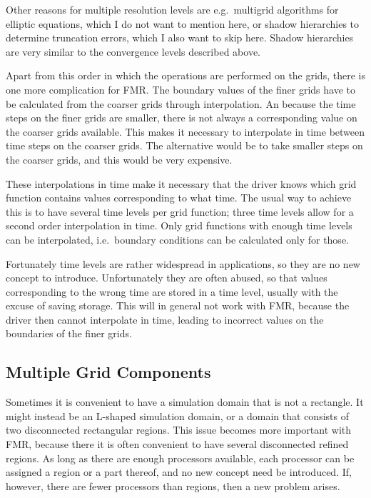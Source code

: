 Other reasons for multiple resolution levels are e.g.\ multigrid
algorithms for elliptic equations, which I do not want to mention
here, or shadow hierarchies to determine truncation errors, which I
also want to skip here.  Shadow hierarchies are very similar to the
convergence levels described above.

Apart from this order in which the operations are performed on the
grids, there is one more complication for FMR.  The boundary values of
the finer grids have to be calculated from the coarser grids through
interpolation.  An because the time steps on the finer grids are
smaller, there is not always a corresponding value on the coarser
grids available.  This makes it necessary to interpolate in time
between time steps on the coarser grids.  The alternative would be to
take smaller steps on the coarser grids, and this would be very
expensive.

These interpolations in time make it necessary that the driver knows
which grid function contains values corresponding to what time.  The
usual way to achieve this is to have several time levels per grid
function; three time levels allow for a second order interpolation in
time.  Only grid functions with enough time levels can be
interpolated, i.e.\ boundary conditions can be calculated only for
those.

Fortunately time levels are rather widespread in applications, so they
are no new concept to introduce.  Unfortunately they are often abused,
so that values corresponding to the wrong time are stored in a time
level, usually with the excuse of saving storage.  This will in
general not work with FMR, because the driver then cannot interpolate
in time, leading to incorrect values on the boundaries of the finer
grids.

\subsection{Multiple Grid Components}

Sometimes it is convenient to have a simulation domain that is not a
rectangle.  It might instead be an L-shaped simulation domain, or a
domain that consists of two disconnected rectangular regions.  This
issue becomes more important with FMR, because there it is often
convenient to have several disconnected refined regions.  As long as
there are enough processors available, each processor can be assigned
a region or a part thereof, and no new concept need be introduced.
If, however, there are fewer processors than regions, then a new
problem arises.


